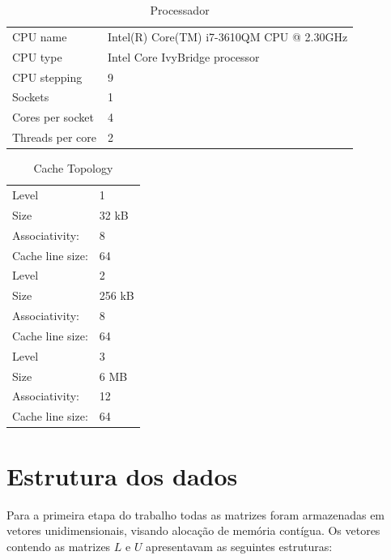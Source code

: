 \documentclass[12pt]{article}
\begin{document}
\begin{table}[H]
\centering
\caption{Processador}
\label{my-label}
\begin{tabular}{ll}
CPU name         & Intel(R) Core(TM) i7-3610QM CPU @ 2.30GHz \\
CPU type         & Intel Core IvyBridge processor            \\
CPU stepping     & 9                                       \\ \hline
Sockets          & 1                                       \\
Cores per socket & 4                                       \\
Threads per core & 2
\end{tabular}
\end{table}

\begin{table}[H]
\centering
\caption{Cache Topology}
\label{my-label}
\begin{tabular}{ll}
Level        & 1                              \\
Size         & 32 kB                          \\
Associativity: & 8                            \\
Cache line size: &  64                        \\\hline
Level        & 2                              \\
Size         & 256 kB                         \\
Associativity: & 8                            \\
Cache line size: &  64                        \\\hline
Level        & 3                              \\
Size         & 6 MB                           \\
Associativity: & 12                           \\
Cache line size: &  64                        \\
\end{tabular}
\end{table}

\section{Estrutura dos dados} \label{sec:firstpage}

Para a primeira etapa do trabalho todas as matrizes foram armazenadas em vetores unidimensionais, visando alocação de memória contígua. Os vetores contendo as matrizes $L$ e $U$ apresentavam as seguintes estruturas:
\end{document}
